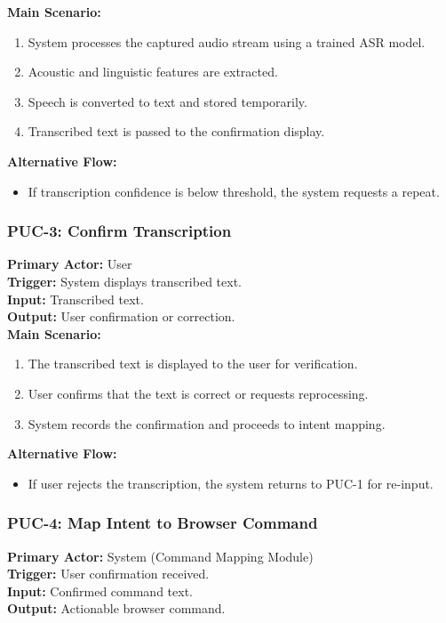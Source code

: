\documentclass[11pt]{article}
\begin{document}
\textbf{Main Scenario:}
\begin{enumerate}
  \item System processes the captured audio stream using a trained ASR model.
  \item Acoustic and linguistic features are extracted.
  \item Speech is converted to text and stored temporarily.
  \item Transcribed text is passed to the confirmation display.
\end{enumerate}

\textbf{Alternative Flow:}
\begin{itemize}
  \item If transcription confidence is below threshold, the system requests a repeat.
\end{itemize}

\bigskip

\subsubsection*{PUC-3: Confirm Transcription}
\textbf{Primary Actor:} User \\
\textbf{Trigger:} System displays transcribed text. \\
\textbf{Input:} Transcribed text. \\
\textbf{Output:} User confirmation or correction. \\

\textbf{Main Scenario:}
\begin{enumerate}
  \item The transcribed text is displayed to the user for verification.
  \item User confirms that the text is correct or requests reprocessing.
  \item System records the confirmation and proceeds to intent mapping.
\end{enumerate}

\textbf{Alternative Flow:}
\begin{itemize}
  \item If user rejects the transcription, the system returns to PUC-1 for re-input.
\end{itemize}

\bigskip

\subsubsection*{PUC-4: Map Intent to Browser Command}
\textbf{Primary Actor:} System (Command Mapping Module) \\
\textbf{Trigger:} User confirmation received. \\
\textbf{Input:} Confirmed command text. \\
\textbf{Output:} Actionable browser command. \\
\end{document}

